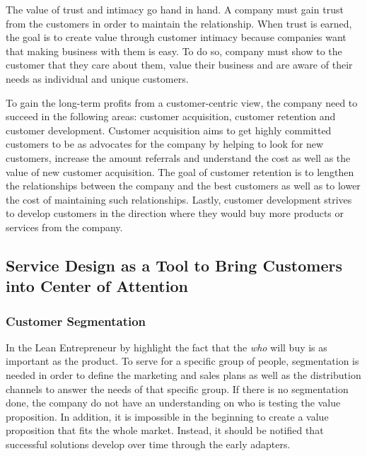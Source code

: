 The value of trust and intimacy go hand in hand. A company must gain trust from the customers in order to maintain the relationship. When trust is earned, the goal is to create value through customer intimacy because companies want that making business with them is easy. To do so, company must show to the customer that they care about them, value their business and are aware of their needs as individual and unique customers. \parencite{Parniangtong:2017}

To gain the long-term profits from a customer-centric view, the company need to succeed in the following areas: customer acquisition, customer retention and customer development. Customer acquisition aims to get highly committed customers to be as advocates for the company by helping to look for new customers, increase the amount referrals and understand the cost as well as the value of new customer acquisition. The goal of customer retention is to lengthen the relationships between the company and the best customers as well as to lower the cost of maintaining such relationships. Lastly, customer development strives to develop customers in the direction where they would buy more products or services from the company. \parencite{Fader:2012}


\subsection{Service Design as a Tool to Bring Customers into Center of Attention}

\subsubsection*{Customer Segmentation}

In the Lean Entrepreneur by \textcite{LeanEntrepreneur:2013} highlight the fact that the \emph{who} will buy is as important as the product. To serve for a specific group of people, segmentation is needed in order to define the marketing and sales plans as well as the distribution channels to answer the needs of that specific group. If there is no segmentation done, the company do not have an understanding on who is testing the value proposition. In addition, it is impossible in the beginning to create a value proposition that fits the whole market. Instead, it should be notified that successful solutions develop over time through the early adapters.

